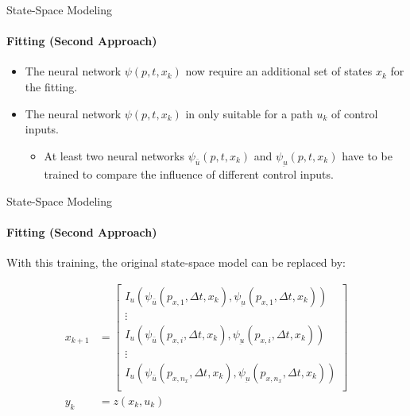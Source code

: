 \begin{frame}{State-Space Modeling}
\framesubtitle{Fitting (Second Approach)}

\begin{itemize}
    \item The neural network $\psi(p, t, x_k)$ now require an additional set of states $x_k$ for the fitting.
    \item The neural network $\psi(p, t, x_k)$ in only suitable for a path $u_k$ of control inputs.
    \begin{itemize}
        \item At least two neural networks $\psi_{\bar{u}}(p, t, x_k)$ and $\psi_{\underbar{u}}(p, t, x_k)$ have to be trained to compare the influence of different control inputs.
    \end{itemize}
\end{itemize}

\end{frame}

\begin{frame}{State-Space Modeling}
\framesubtitle{Fitting (Second Approach)}

With this training, the original state-space model can be replaced by:

\begin{align}
x_{k+1} &= \left[\begin{matrix}
I_u \left(\psi_{\bar{u}}(p_{x,1}, \Delta t, x_k), \psi_{\underbar{u}}(p_{x,1}, \Delta t, x_k)\right) \\
\vdots\\
I_u \left(\psi_{\bar{u}}(p_{x,i}, \Delta t, x_k), \psi_{\underbar{u}}(p_{x,i}, \Delta t, x_k)\right) \\
\vdots\\
I_u \left(\psi_{\bar{u}}(p_{x,n_x}, \Delta t, x_k), \psi_{\underbar{u}}(p_{x,n_x}, \Delta t, x_k)\right) \\
\end{matrix}
\right]\\
y_k &= z(x_k, u_k)
\end{align}

\end{frame}
